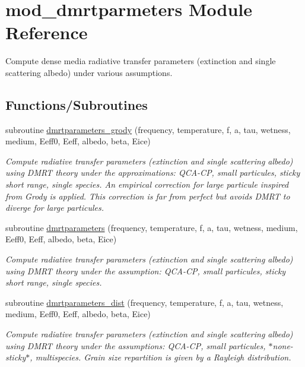 \hypertarget{namespacemod__dmrtparmeters}{
\section{mod\_\-dmrtparmeters Module Reference}
\label{namespacemod__dmrtparmeters}
}


Compute dense media radiative transfer parameters (extinction and single scattering albedo) under various assumptions.  


\subsection*{Functions/Subroutines}
\begin{DoxyCompactItemize}
\item 
subroutine \hyperlink{namespacemod__dmrtparmeters_a786ad3cc8541177f7049a0e9ca2ba7c0}{dmrtparameters\_\-grody} (frequency, temperature, f, a, tau, wetness, medium, Eeff0, Eeff, albedo, beta, Eice)
\begin{DoxyCompactList}\small\item\em Compute radiative transfer parameters (extinction and single scattering albedo) using DMRT theory under the approximations: QCA-\/CP, small particules, sticky short range, single species. An empirical correction for large particule inspired from Grody is applied. This correction is far from perfect but avoids DMRT to diverge for large particules. \end{DoxyCompactList}\item 
subroutine \hyperlink{namespacemod__dmrtparmeters_a5382940ff2d1907951e3e57b9d5add23}{dmrtparameters} (frequency, temperature, f, a, tau, wetness, medium, Eeff0, Eeff, albedo, beta, Eice)
\begin{DoxyCompactList}\small\item\em Compute radiative transfer parameters (extinction and single scattering albedo) using DMRT theory under the assumption: QCA-\/CP, small particules, sticky short range, single species. \end{DoxyCompactList}\item 
subroutine \hyperlink{namespacemod__dmrtparmeters_af54bb3110997d9f2fb5673c3b31c0e49}{dmrtparameters\_\-dist} (frequency, temperature, f, a, tau, wetness, medium, Eeff0, Eeff, albedo, beta, Eice)
\begin{DoxyCompactList}\small\item\em Compute radiative transfer parameters (extinction and single scattering albedo) using DMRT theory under the assumptions: QCA-\/CP, small particules, $\ast$none-\/sticky$\ast$, multispecies. Grain size repartition is given by a Rayleigh distribution. \end{DoxyCompactList}\end{DoxyCompactItemize}



